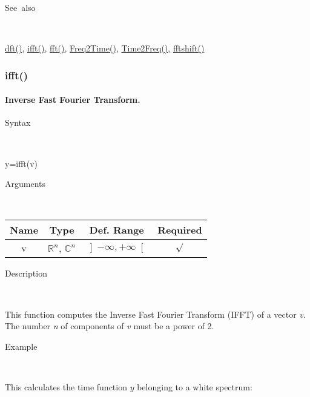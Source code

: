 \begin{description}
\item [See~also]~
\end{description}
\textcolor{blue}{\hyperlink{dft}{dft()}}\textcolor{black}{,} \textcolor{blue}{\hyperlink{ifft}{ifft()}}\textcolor{black}{,}
\textcolor{blue}{\hyperlink{fft}{fft()}}\textcolor{black}{,}
\textcolor{blue}{\hyperlink{Freq2Time}{Freq2Time()}}\textcolor{black}{,}
\textcolor{blue}{\hyperlink{Time2Freq}{Time2Freq()}}\textcolor{black}{,}
\textcolor{blue}{\hyperlink{fftshift}{fftshift()}}


\newpage
\subsubsection*{\hypertarget{ifft}{}{\Large ifft()}}


\paragraph{\label{par:Inverse-Fast-Fourier}Inverse Fast Fourier Transform.}

\begin{description}
\item [Syntax]~
\end{description}
y=ifft(v)

\begin{description}
\item [Arguments]~
\end{description}
\begin{tabular}{|c|c|c|c|}
\hline 
Name&
Type&
Def. Range&
Required\tabularnewline
\hline
\hline 
v&
$\mathbb{R}^{n}$, $\mathbb{C}^{n}$&
$\left]-\infty,+\infty\right[$&
$\surd$\tabularnewline
\hline 
\end{tabular}

\begin{description}
\item [Description]~
\end{description}
This function computes the Inverse Fast Fourier Transform (IFFT) of a
vector \textit{v}.  The number \textit{n} of components of \textit{v}
must be a power of 2.

\begin{description}
\item [Example]~
\end{description}
This calculates the time function $y$ belonging to a white spectrum:

